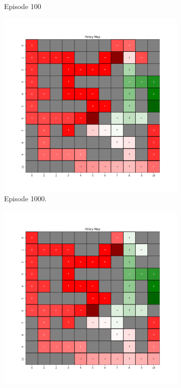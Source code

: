 \documentclass{assignment}
\begin{document}
\begin{figure}[H]
\begin{subfigure}{0.3\textwidth}
    \caption{Episode 100}
    \end{subfigure}
    \begin{subfigure}{0.3\textwidth}
        \includegraphics[width=\textwidth]{figures/policy_q/alpha_sweep/policy_alpha_0.1_gamma_0.95_epsilon_0.2_iteration_1000.png}
    \caption{Episode 1000.}
    \end{subfigure}\hfill
    \begin{subfigure}{0.3\textwidth}
        \includegraphics[width=\textwidth]{figures/policy_q/alpha_sweep/policy_alpha_0.1_gamma_0.95_epsilon_0.2_iteration_5000.png}

\end{subfigure}
\end{figure}
\end{document}
